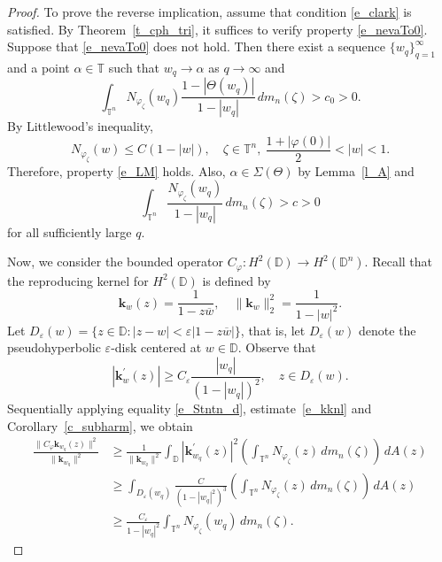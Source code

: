 \documentclass{amsart}
\numberwithin{equation}{section}
\theoremstyle{definition}
\newcommand{\al}{\alpha}
\newcommand{\neva}{N}
\newcommand{\aream}{A}
\newcommand{\meal}{m_n}
\newcommand{\diin}{\Theta}
\newcommand{\er}{\varepsilon}
\newcommand{\za}{\zeta}
\newcommand{\ph}{\varphi}
\newcommand{\cph}{C_\varphi}
\newcommand{\Dbb}{\mathbb D}
\newcommand{\Tbb}{\mathbb T}
\newcommand{\tn}{\mathbb{T}^n}
\newcommand{\dn}{\mathbb{D}^n}
\newcommand{\kknl}{\mathbf{k}}
\newcommand{\spr}{\Sigma}
\begin{document}
\begin{proof}
To prove the reverse implication, assume that condition \eqref{e_clark} is satisfied.
By Theo\-rem~\ref{t_cph_tri}, it suffices to verify property \eqref{e_nevaTo0}.
Suppose that \eqref{e_nevaTo0} does not hold.
Then there exist a sequence $\{w_q\}_{q=1}^\infty$ and a point $\al\in\Tbb$ such that
$w_q\to \al$ as $q\to \infty$ and
\[
\int_{\tn}\neva_{\ph_\za}(w_q) \frac{1-|\diin(w_q)|}{1-|w_q|}\, d\meal(\za) > c_0 > 0.
\]
By Littlewood's inequality,
\[
\neva_{\ph_\za}(w) \le C (1-|w|), \quad\za\in\tn,\ \frac{1+|\ph(0)|}{2} < |w| <1.
\]
Therefore, property \eqref{e_LM} holds. Also, $\al\in\spr(\diin)$ by Lemma~\ref{l_A} and
\begin{equation}\label{e_NgC}
\int_{\tn} \frac{\neva_{\ph_\za}(w_q)}{1-|w_q|}\, d\meal(\za) > c > 0
\end{equation}
for all sufficiently large $q$.


Now, we consider the bounded operator $\cph: H^2(\Dbb) \to H^2(\dn)$.
Recall that the reproducing kernel for $H^2(\Dbb)$ is defined by
\[
\kknl_w (z) = \frac{1}{1- z\overline{w}}, \quad \|\kknl_w\|_2^2 = \frac{1}{1-|w|^2}.
\]
Let $D_\er(w) = \{z\in\Dbb: |z-w| < \er|1- z\overline{w}|\}$, that is,
let $D_\er(w)$ denote the pseudohyperbolic $\er$-disk centered at  $w\in \Dbb$.
Observe that
\begin{equation}\label{e_kknl}
|\kknl_w^\prime (z)| \ge C_\er \frac{|w_q|}{(1-|w_q|)^2}, \quad z\in D_\er(w).
\end{equation}
Sequentially applying equality \eqref{e_Stntn_d}, estimate~\eqref{e_kknl} and Corollary~\ref{c_subharm}, we obtain
\begin{equation}\label{e_rker_estim}
\begin{aligned}
\frac{\|C_\ph \kknl_{w_q}(z)\|^2}{\|\kknl_{w_q}\|^2}
    &\ge \frac{1}{\|\kknl_{w_q}\|^2} \int_{\Dbb} |\kknl^\prime_{w_q}(z)|^2
\left(\int_{\tn} \neva_{\ph_\za}(z)\,  d\meal(\za) \right)\, d\aream(z)\\
    &\ge \int_{D_\er(w_q)} \frac{C}{(1- |w_q|^2)^{3}}
\left(\int_{\tn} \neva_{\ph_\za}(z)\,  d\meal(\za) \right)\, d\aream(z)\\
    &\ge \frac{C_\er}{1- |w_q|^2} \int_{\tn} \neva_{\ph_\za}(w_q)\,d\meal(\za).
\end{aligned}
\end{equation}



\end{proof}
\end{document}
